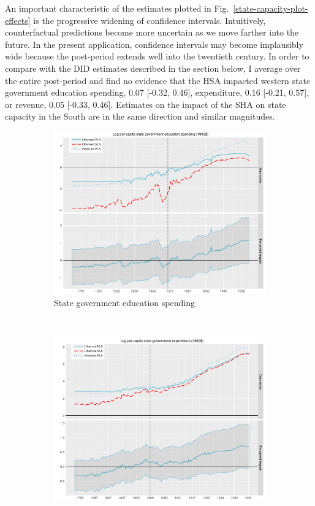 \documentclass[12pt]{article}
\begin{document}
An important characteristic of the estimates plotted in Fig.~\ref{state-capacity-plot-effects} is the progressive widening of confidence intervals. Intuitively, counterfactual predictions become more uncertain as we move farther into the future. In the present application, confidence intervals may become implausibly wide because the post-period extends well into the twentieth century. In order to compare with the DID estimates described in the section below, I average over the entire post-period and find no evidence that the HSA impacted western state government education spending, 0.07 [-0.32, 0.46], expenditure, 0.16 [-0.21, 0.57], or revenue, 0.05 [-0.33, 0.46]. Estimates on the impact of the SHA on state capacity in the South are in the same direction and similar magnitudes. 

\begin{figure}[htbp]
	\centering
	\begin{subfigure}[t]{0.48\textwidth}
		\centering
		\includegraphics[width=\textwidth]{plots/mc-educ-pc.png}
		\caption{State government education spending}
	\end{subfigure}
	~ 
	\begin{subfigure}[t]{0.48\textwidth}
		\centering
		\includegraphics[width=\textwidth]{plots/mc-exp-pc.png}

\end{subfigure}
\end{figure}
\end{document}
